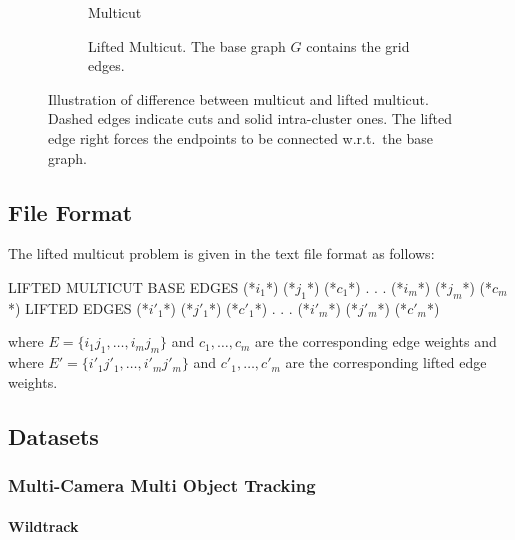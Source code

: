 \begin{figure}[H]
    \begin{subfigure}{0.49\columnwidth}
    \begin{center}
        
    \end{center}
        \caption{Multicut}
    \end{subfigure}
    \hfill
    \begin{subfigure}{0.49\columnwidth}
    \begin{center}
        
    \end{center}
        \caption{Lifted Multicut. The base graph $G$ contains the grid edges.}
    \end{subfigure}
        \caption{
            Illustration of difference between multicut and lifted multicut.
            Dashed edges indicate cuts and solid intra-cluster ones.
            The lifted edge right forces the endpoints to be connected w.r.t.\ the base graph.
        }
        \label{fig:lifted-multicut}
\end{figure}
    
\subsection{File Format}
The lifted multicut problem is given in the text file format as follows:

\begin{fileformat}
LIFTED MULTICUT
BASE EDGES
(*$i_1$*) (*$j_1$*) (*$c_1$*)
.
.
.
(*$i_m$*) (*$j_m$*) (*$c_m$*)
LIFTED EDGES
(*$i'_1$*) (*$j'_1$*) (*$c'_1$*)
.
.
.
(*$i'_m$*) (*$j'_m$*) (*$c'_m$*) 
\end{fileformat}
where $E = \{i_1 j_1, \ldots, i_m j_m\}$ and $c_1,\ldots,c_m$ are the corresponding edge weights and
where $E' = \{i'_1 j'_1, \ldots, i'_m j'_m\}$ and $c'_1,\ldots,c'_m$ are the corresponding lifted edge weights.

\subsection{Datasets}

\subsubsection{Multi-Camera Multi Object Tracking}
\paragraph{Wildtrack}
